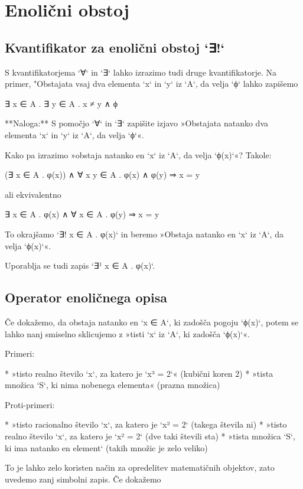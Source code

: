 \chapter{Enolični obstoj}

\section{Kvantifikator za enolični obstoj `∃!`}

S kvantifikatorjema `∀` in `∃` lahko izrazimo tudi druge kvantifikatorje.
Na primer, "Obstajata vsaj dva elementa `x` in `y` iz `A`, da velja `ϕ` lahko zapišemo

    ∃ x ∈ A . ∃ y ∈ A . x ≠ y ∧ ϕ

**Naloga:** S pomočjo `∀` in `∃` zapišite izjavo »Obstajata natanko dva elementa `x` in `y` iz `A`, da velja `ϕ`«.

Kako pa izrazimo »obstaja natanko en `x` iz `A`, da velja `ϕ(x)`«? Takole:

    (∃ x ∈ A . φ(x)) ∧ ∀ x y ∈ A . φ(x) ∧ φ(y) ⇒ x = y

ali ekvivalentno

    ∃ x ∈ A . φ(x) ∧ ∀ x ∈ A . φ(y) ⇒ x = y

To okrajšamo `∃! x ∈ A . φ(x)` in beremo »Obstaja natanko en `x` iz `A`, da velja `ϕ(x)`«.

Uporablja se tudi zapis `∃¹ x ∈ A . φ(x)`.

\section{Operator enoličnega opisa}

Če dokažemo, da obstaja natanko en `x ∈ A`, ki zadošča pogoju `ϕ(x)`, potem se lahko nanj smiselno sklicujemo z »tisti
`x` iz `A`, ki zadošča `ϕ(x)`«.

Primeri:

* »tisto realno število `x`, za katero je `x³ = 2`« (kubični koren 2)
* »tista množica `S`, ki nima nobenega elementa« (prazna množica)

Proti-primeri:

* »tisto racionalno število `x`, za katero je `x² = 2` (takega števila ni)
* »tisto realno število `x`, za katero je `x² = 2` (dve taki števili sta)
* »tista množica `S`, ki ima natanko en element` (takih množic je zelo veliko)

To je lahko zelo koristen način za opredelitev matematičnih objektov, zato uvedemo zanj simbolni zapis.
Če dokažemo

